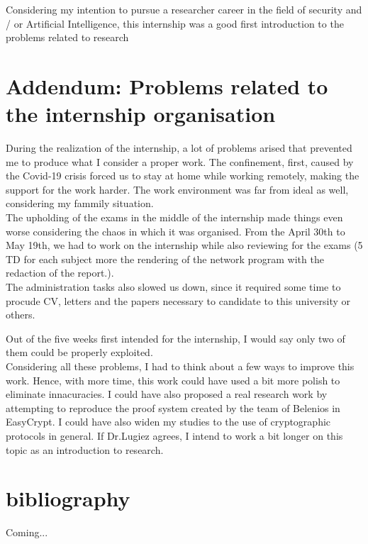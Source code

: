 \documentclass[12pt, a4paper]{report}
\begin{document}
Considering my intention to pursue a researcher career in the field of security and / or Artificial Intelligence, this internship was a good first introduction to the problems related to research

\section{Addendum: Problems related to the internship organisation}

During the realization of the internship, a lot of problems arised that prevented me to produce what I consider a proper work. The confinement, first, caused by the Covid-19 crisis forced us to stay at home while working remotely, making the support for the work harder. The work environment was far from ideal as well, considering my fammily situation.\\ 

The upholding of the exams in the middle of the internship made things even worse considering the chaos in which it was organised. From the April 30th to May 19th, we had to work on the internship while also reviewing for the exams (5 TD for each subject more the rendering of the network program with the redaction of the report.).\\

The administration tasks also slowed us down, since it required some time to procude CV, letters and the papers necessary to candidate to this university or others.

Out of the five weeks first intended for the internship, I would say only two of them could be properly exploited.\\

Considering all these problems, I had to think about a few ways to improve this work. Hence, with more time, this work could have used a bit more polish to eliminate innacuracies. I could have also proposed a real research work by attempting to reproduce the proof system created by the team of Belenios in EasyCrypt. I could have also widen my studies to the use of cryptographic protocols in general. If Dr.Lugiez agrees, I intend to work a bit longer on this topic as an introduction to research.
 



\section{bibliography}


Coming...
\end{document}
